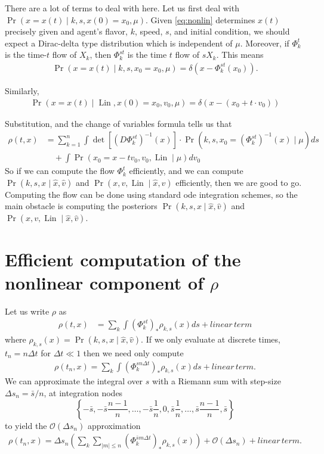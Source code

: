 \documentclass[12pt]{amsart}
\DeclareMathOperator{\Lin}{Lin}
\begin{document}
There are a lot of terms to deal with here.
Let us first deal with $\Pr( x = x(t) \mid k,s, x(0) = x_0, \mu )$.
Given \eqref{eq:nonlin} determines $x(t)$ precisely given and agent's flavor, $k$, speed, $s$, and initial condition,
we should expect a Dirac-delta type distribution which is independent of $\mu$.
Moreover, if $\Phi_k^t$ is the time-$t$ flow of $X_k$, then $\Phi_k^{st}$ is the time $t$ flow of $s X_k$. 
This means
\begin{align*}
	\Pr( x  = x(t) \mid k,s, x_0 = x_0 , \mu ) = \delta( x - \Phi_k^{st}( x_0) ).
\end{align*}

Similarly,
\begin{align*}
	\Pr( x = x(t) \mid \Lin, x(0) = x_0, v_0 , \mu ) = \delta \left( x - (x_0 + t \cdot v_0 ) \right)
\end{align*}

Substitution, and the change of variables formula tells us that
\begin{align*}
	\rho(t,x) &= \sum_{k=1}^n \int \det \left[ (D\Phi_{k}^{st})^{-1}(x)  \right] \cdot \Pr( k, s, x_0 = (\Phi_{k}^{st})^{-1} (x) \mid \mu) ds \\
		&\quad + \int \Pr( x_0 = x- t v_0 ,v_0, \Lin \mid \mu)dv_0
\end{align*}
So if we can compute the flow $\Phi_k^{t}$ efficiently, and we can compute $\Pr( k,s,x \mid \hat{x}, \hat{v} )$ and $\Pr( x, v, \Lin \mid \hat{x}, \hat{v} )$ efficiently, then we are good to go.
Computing the flow can be done using standard ode integration schemes, so the main obstacle is computing the posteriors $\Pr( k,s,x \mid \hat{x}, \hat{v} )$ and $\Pr( x, v, \Lin \mid \hat{x}, \hat{v} )$.

\section{Efficient computation of the nonlinear component of $\rho$}
Let us write $\rho$ as
\begin{align*}
	\rho(t,x) &= \sum_{k} \int (\Phi_{k}^{st})_* \rho_{k,s}(x) ds + linear\, term
\end{align*}
where $\rho_{k,s}(x) = \Pr( k, s, x \mid \hat{x}, \hat{v})$.
If we only evaluate at discrete times, $t_n = n \Delta t$ for $\Delta t \ll 1$ then we need only compute
\begin{align*}
	\rho(t_n , x) =  \sum_{k} \int (\Phi_{k}^{s n \Delta t})_* \rho_{k,s}(x) ds + linear\, term.
\end{align*}
We can approximate the integral over $s$ with a Riemann sum with step-size $\Delta s_n = \bar{s} / n$, at integration nodes
$$
	\left\{ -\bar{s} , -\bar{s} \frac{n-1}{n}, \dots, -\bar{s} \frac{1}{n}, 0, \bar{s} \frac{1}{n}, \dots, \bar{s} \frac{n-1}{n}, \bar{s} \right\}
$$
to yield the $\mathcal{O}( \Delta s_n )$ approximation
\begin{align}
	\rho(t_n , x) = \Delta s_n \left( \sum_{k} \sum_{ |m| \leq n } (\Phi_{k}^{ \bar{s} m \Delta t})_* \rho_{k,s}(x) \right) +\mathcal{O}( \Delta s_n ) + linear\, term. \label{eq:approx 1}
\end{align}
\end{document}
